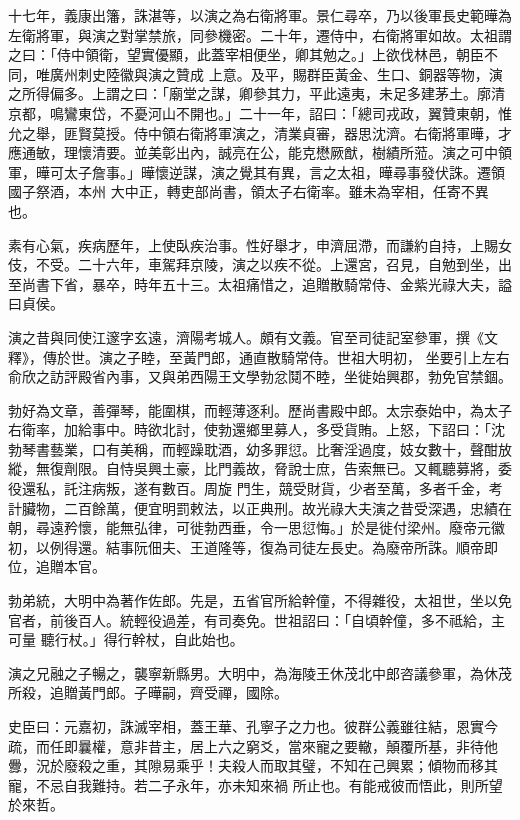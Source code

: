 \begin{pinyinscope}
 十七年，義康出籓，誅湛等，以演之為右衛將軍。景仁尋卒，乃以後軍長史範曄為左衛將軍，與演之對掌禁旅，同參機密。二十年，遷侍中，右衛將軍如故。太祖謂之曰：「侍中領衛，望實優顯，此蓋宰相便坐，卿其勉之。」上欲伐林邑，朝臣不同，唯廣州刺史陸徽與演之贊成
 上意。及平，賜群臣黃金、生口、銅器等物，演之所得偏多。上謂之曰：「廟堂之謀，卿參其力，平此遠夷，未足多建茅土。廓清京都，鳴鸞東岱，不憂河山不開也。」二十一年，詔曰：「總司戎政，翼贊東朝，惟允之舉，匪賢莫授。侍中領右衛將軍演之，清業貞審，器思沈濟。右衛將軍曄，才應通敏，理懷清要。並美彰出內，誠亮在公，能克懋厥猷，樹績所蒞。演之可中領軍，曄可太子詹事。」曄懷逆謀，演之覺其有異，言之太祖，曄尋事發伏誅。遷領國子祭酒，本州
 大中正，轉吏部尚書，領太子右衛率。雖未為宰相，任寄不異也。



 素有心氣，疾病歷年，上使臥疾治事。性好舉才，申濟屈滯，而謙約自持，上賜女伎，不受。二十六年，車駕拜京陵，演之以疾不從。上還宮，召見，自勉到坐，出至尚書下省，暴卒，時年五十三。太祖痛惜之，追贈散騎常侍、金紫光祿大夫，謚曰貞侯。



 演之昔與同使江邃字玄遠，濟陽考城人。頗有文義。官至司徒記室參軍，撰《文釋》，傳於世。演之子睦，至黃門郎，通直散騎常侍。世祖大明初，
 坐要引上左右俞欣之訪評殿省內事，又與弟西陽王文學勃忿鬩不睦，坐徙始興郡，勃免官禁錮。



 勃好為文章，善彈琴，能圍棋，而輕薄逐利。歷尚書殿中郎。太宗泰始中，為太子右衛率，加給事中。時欲北討，使勃還鄉里募人，多受貨賄。上怒，下詔曰：「沈勃琴書藝業，口有美稱，而輕躁耽酒，幼多罪愆。比奢淫過度，妓女數十，聲酣放縱，無復劑限。自恃吳興土豪，比門義故，脅說士庶，告索無已。又輒聽募將，委役還私，託注病叛，遂有數百。周旋
 門生，競受財貨，少者至萬，多者千金，考計臟物，二百餘萬，便宜明罰敕法，以正典刑。故光祿大夫演之昔受深遇，忠績在朝，尋遠矜懷，能無弘律，可徙勃西垂，令一思愆悔。」於是徙付梁州。廢帝元徽初，以例得還。結事阮佃夫、王道隆等，復為司徒左長史。為廢帝所誅。順帝即位，追贈本官。



 勃弟統，大明中為著作佐郎。先是，五省官所給幹僮，不得雜役，太祖世，坐以免官者，前後百人。統輕役過差，有司奏免。世祖詔曰：「自頃幹僮，多不祗給，主可量
 聽行杖。」得行幹杖，自此始也。



 演之兄融之子暢之，襲寧新縣男。大明中，為海陵王休茂北中郎咨議參軍，為休茂所殺，追贈黃門郎。子曄嗣，齊受禪，國除。



 史臣曰：元嘉初，誅滅宰相，蓋王華、孔寧子之力也。彼群公義雖往結，恩實今疏，而任即曩權，意非昔主，居上六之窮爻，當來寵之要轍，顛覆所基，非待他釁，況於廢殺之重，其隙易乘乎！夫殺人而取其璧，不知在己興累；傾物而移其寵，不忌自我難持。若二子永年，亦未知來禍
 所止也。有能戒彼而悟此，則所望於來哲。



\end{pinyinscope}